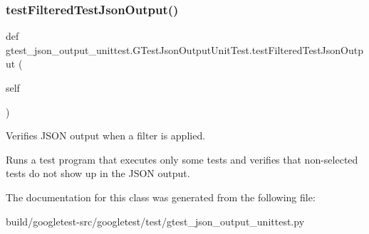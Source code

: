 \subsubsection{\texorpdfstring{test\+Filtered\+Test\+Json\+Output()}{testFilteredTestJsonOutput()}}
{\footnotesize\ttfamily def gtest\+\_\+json\+\_\+output\+\_\+unittest.\+G\+Test\+Json\+Output\+Unit\+Test.\+test\+Filtered\+Test\+Json\+Output (\begin{DoxyParamCaption}\item[{}]{self }\end{DoxyParamCaption})}

\begin{DoxyVerb}Verifies JSON output when a filter is applied.

Runs a test program that executes only some tests and verifies that
non-selected tests do not show up in the JSON output.
\end{DoxyVerb}
 

The documentation for this class was generated from the following file\+:\begin{DoxyCompactItemize}
\item 
build/googletest-\/src/googletest/test/gtest\+\_\+json\+\_\+output\+\_\+unittest.\+py\end{DoxyCompactItemize}
